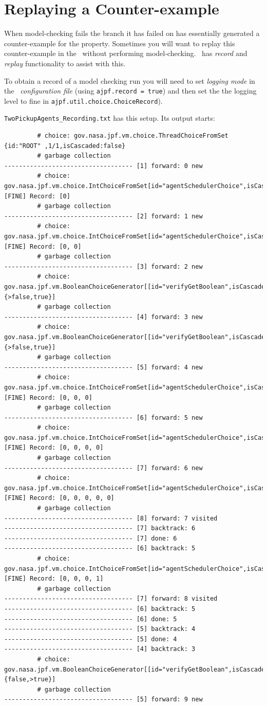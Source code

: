 \section{Replaying a Counter-example}
When model-checking fails the branch it has failed on has essentially generated a counter-example for the property.  Sometimes you will want to replay this counter-example in the \ail\ without performing model-checking.  \ajpf\ has \emph{record} and \emph{replay} functionality to assist with this.

To obtain a record of a model checking run you will need to set \emph{logging mode} in the \emph{\ail\ configuration file} (using \texttt{ajpf.record = true}) and then set the the logging level to fine in \texttt{ajpf.util.choice.ChoiceRecord}).

\texttt{TwoPickupAgents\_Recording.txt} has this setup.  Its output starts:
\begin{verbatim}
		 # choice: gov.nasa.jpf.vm.choice.ThreadChoiceFromSet {id:"ROOT" ,1/1,isCascaded:false}
		 # garbage collection
----------------------------------- [1] forward: 0 new
		 # choice: gov.nasa.jpf.vm.choice.IntChoiceFromSet[id="agentSchedulerChoice",isCascaded:false,>0,1]
[FINE] Record: [0]
		 # garbage collection
----------------------------------- [2] forward: 1 new
		 # choice: gov.nasa.jpf.vm.choice.IntChoiceFromSet[id="agentSchedulerChoice",isCascaded:false,>0,1]
[FINE] Record: [0, 0]
		 # garbage collection
----------------------------------- [3] forward: 2 new
		 # choice: gov.nasa.jpf.vm.BooleanChoiceGenerator[[id="verifyGetBoolean",isCascaded:false,{>false,true}]
		 # garbage collection
----------------------------------- [4] forward: 3 new
		 # choice: gov.nasa.jpf.vm.BooleanChoiceGenerator[[id="verifyGetBoolean",isCascaded:false,{>false,true}]
		 # garbage collection
----------------------------------- [5] forward: 4 new
		 # choice: gov.nasa.jpf.vm.choice.IntChoiceFromSet[id="agentSchedulerChoice",isCascaded:false,>0]
[FINE] Record: [0, 0, 0]
		 # garbage collection
----------------------------------- [6] forward: 5 new
		 # choice: gov.nasa.jpf.vm.choice.IntChoiceFromSet[id="agentSchedulerChoice",isCascaded:false,>0,1]
[FINE] Record: [0, 0, 0, 0]
		 # garbage collection
----------------------------------- [7] forward: 6 new
		 # choice: gov.nasa.jpf.vm.choice.IntChoiceFromSet[id="agentSchedulerChoice",isCascaded:false,>0]
[FINE] Record: [0, 0, 0, 0, 0]
		 # garbage collection
----------------------------------- [8] forward: 7 visited
----------------------------------- [7] backtrack: 6
----------------------------------- [7] done: 6
----------------------------------- [6] backtrack: 5
		 # choice: gov.nasa.jpf.vm.choice.IntChoiceFromSet[id="agentSchedulerChoice",isCascaded:false,0,>1]
[FINE] Record: [0, 0, 0, 1]
		 # garbage collection
----------------------------------- [7] forward: 8 visited
----------------------------------- [6] backtrack: 5
----------------------------------- [6] done: 5
----------------------------------- [5] backtrack: 4
----------------------------------- [5] done: 4
----------------------------------- [4] backtrack: 3
		 # choice: gov.nasa.jpf.vm.BooleanChoiceGenerator[[id="verifyGetBoolean",isCascaded:false,{false,>true}]
		 # garbage collection
----------------------------------- [5] forward: 9 new
\end{verbatim}
